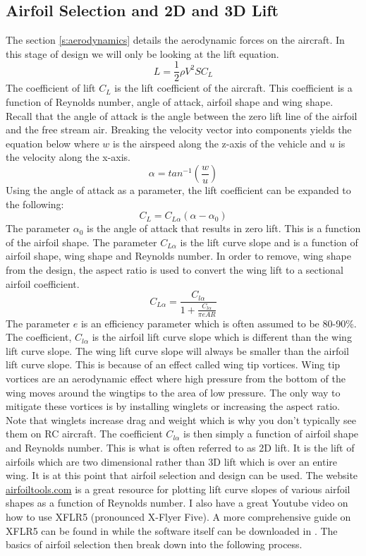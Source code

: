 \documentclass{article}
\def\beq{\begin{equation}}
\def\eeq{\end{equation}}
\begin{document}
\subsection{Airfoil Selection and 2D and 3D Lift}

The section \ref{s:aerodynamics} details the aerodynamic forces on the
aircraft. In this stage of design we will only be looking at the lift
equation.
\begin{equation}
L = \frac{1}2\rho {V}^2 S C_L
\end{equation}
The coefficient of lift $C_L$ is the lift coefficient of the
aircraft. This coefficient is a function of Reynolds number, angle of
attack, airfoil shape and wing shape. Recall that the angle of attack
is the angle between the zero lift line of the airfoil and the free
stream air. Breaking the velocity vector into components yields the
equation below where $w$ is the airspeed along the z-axis of the
vehicle and $u$ is the velocity along the x-axis. 
\begin{equation}\label{e:aoa}
\alpha = tan^{-1}\left(\frac{w} {u} \right)
\end{equation}
Using the angle of attack as a parameter, the lift coefficient can be
expanded to the following:
\beq
C_L = C_{L\alpha}(\alpha-\alpha_0)
\eeq
The parameter $\alpha_0$ is the angle of attack that results in zero
lift. This is a function of the airfoil shape. The parameter
$C_{L\alpha}$ is the lift curve slope and is a function of airfoil
shape, wing shape and Reynolds number. In order to remove, wing shape
from the design, the aspect ratio is used to convert the wing lift to
a sectional airfoil coefficient.
\beq\label{e:ar_equation}
C_{L\alpha} = \frac{C_{l\alpha}}{1+\frac{C_{l\alpha}}{\pi e AR}}
\eeq
The parameter $e$ is an efficiency parameter which is often assumed to
be 80-90\%. The coefficient, $C_{l\alpha}$ is the airfoil lift curve
slope which is different than the wing lift curve slope. The wing lift curve slope
will always be smaller than the airfoil lift curve slope. This is
because of an effect called wing tip vortices. Wing tip vortices are
an aerodynamic effect where high pressure from the bottom of the wing
moves around the wingtips to the area of low pressure. The only way to
mitigate these vortices is by installing winglets or increasing the
aspect ratio. Note that winglets increase drag and weight which is why
you don't typically see them on RC aircraft. The coefficient
$C_{l\alpha}$ is then simply a function of airfoil shape and
Reynolds number. This is what is often referred to as 2D lift. It is
the lift of airfoils which are two dimensional rather than 3D lift
which is over an entire wing. It is at this point that airfoil
selection and design can be used. The website \url{airfoiltools.com}
is a great resource for plotting lift curve slopes of various airfoil
shapes as a function of Reynolds number. I also have a great Youtube
video on how to use XFLR5 (pronounced X-Flyer
Five)\cite{XFLR5_tutorial}. A more comprehensive guide on XFLR5 can be
found in \cite{XFLR5_Guidelines} while the software itself can be
downloaded in \cite{XFLR5}. The basics of airfoil selection then break
down into the following 
process.
\end{document}
